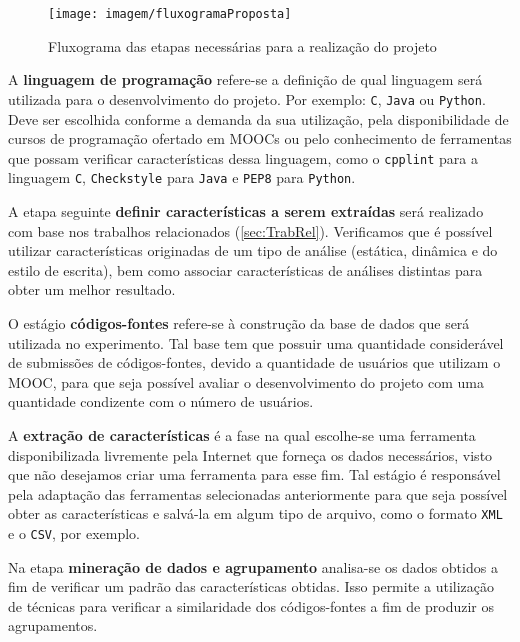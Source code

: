	 	\begin{figure}[h]
	 		\centering
	 		\texttt{[image: imagem/fluxogramaProposta]}
	 		\caption{Fluxograma das etapas necessárias para a realização do projeto}
	 		\label{fig:fluxogramaProposta}
	 	\end{figure}
	 	
	 	A \textbf{linguagem de programação} refere-se a definição de qual linguagem será
	 	utilizada para o desenvolvimento do projeto. Por exemplo: \texttt{C}, \texttt{Java}
	 	ou \texttt{Python}. Deve ser escolhida conforme a demanda da sua utilização, pela
	 	disponibilidade de cursos de programação ofertado em \acs{MOOC}s ou pelo conhecimento de
	 	ferramentas que possam verificar características dessa linguagem, como o
	 	\texttt{cpplint} para a linguagem \texttt{C}, \texttt{Checkstyle} para
	 	\texttt{Java} e \texttt{PEP8} para \texttt{Python}.
	 	
	 	A etapa seguinte \textbf{definir características a serem extraídas} será realizado
	 	com base nos trabalhos relacionados (\cref{sec:TrabRel}). Verificamos que é
	 	possível utilizar características originadas de um tipo de análise (estática,
	 	dinâmica e do estilo de escrita), bem como associar características de análises
	 	distintas para obter um melhor resultado.
	 	
	 	O estágio \textbf{códigos-fontes} refere-se à construção da base de dados que será
	 	utilizada no experimento. Tal base tem que possuir uma quantidade considerável de
	 	submissões de códigos-fontes, devido a quantidade de usuários que utilizam o \acs{MOOC},
	 	para que seja possível avaliar o desenvolvimento do projeto com uma quantidade
	 	condizente com o número de usuários.
	 	
	 	A \textbf{extração de características} é a fase na qual escolhe-se uma ferramenta
	 	disponibilizada livremente pela Internet que forneça os dados necessários, visto
	 	que não desejamos criar uma ferramenta para esse fim. Tal estágio é responsável pela
	 	adaptação das ferramentas selecionadas anteriormente para que seja possível obter
	 	as características e salvá-la em algum tipo de arquivo, como o formato \texttt{XML}
	 	e o \texttt{CSV}, por exemplo.
	 	
	 	Na etapa \textbf{mineração de dados e agrupamento} analisa-se os dados obtidos a
	 	fim de verificar um padrão das características obtidas. Isso permite a utilização
	 	de técnicas para verificar a similaridade dos códigos-fontes a fim
	 	de produzir os agrupamentos.
	 	
